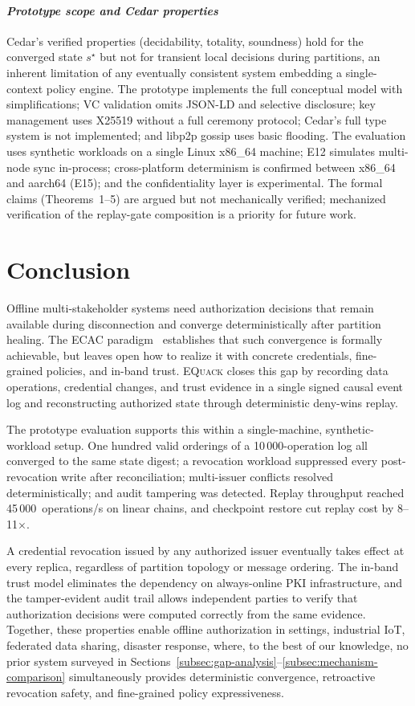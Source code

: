 \documentclass[10pt,journal,compsoc]{IEEEtran}
\newcommand{\equack}{\textsc{EQuack}}
\begin{document}
\paragraph*{\textit{Prototype scope and Cedar properties}}
Cedar's verified properties (decidability, totality, soundness) hold for the converged state $s^\star$ but not for transient local decisions during partitions, an inherent limitation of any eventually consistent system embedding a single-context policy engine. The prototype implements the full conceptual model with simplifications; VC validation omits JSON-LD and selective disclosure; key management uses X25519 without a full ceremony protocol; Cedar's full type system is not implemented; and libp2p gossip uses basic flooding. The evaluation uses synthetic workloads on a single Linux x86\_64 machine; E12 simulates multi-node sync in-process; cross-platform determinism is confirmed between x86\_64 and aarch64 (E15); and the confidentiality layer is experimental. The formal claims (Theorems~1--5) are argued but not mechanically verified; mechanized verification of the replay-gate composition is a priority for future work.

\section{Conclusion}
\label{sec:conclusion}

Offline multi-stakeholder systems need authorization decisions that remain available during disconnection and converge deterministically after partition healing. The ECAC paradigm~\cite{jacob2024eventuallyac} establishes that such convergence is formally achievable, but leaves open how to realize it with concrete credentials, fine-grained policies, and in-band trust. \equack{} closes this gap by recording data operations, credential changes, and trust evidence in a single signed causal event log and reconstructing authorized state through deterministic deny-wins replay.

The prototype evaluation supports this within a single-machine, synthetic-workload setup. One hundred valid orderings of a 10\,000-operation log all converged to the same state digest; a revocation workload suppressed every post-revocation write after reconciliation; multi-issuer conflicts resolved deterministically; and audit tampering was detected. Replay throughput reached 45\,000~operations/s on linear chains, and checkpoint restore cut replay cost by 8--11$\times$.

A credential revocation issued by any authorized issuer eventually takes effect at every replica, regardless of partition topology or message ordering. The in-band trust model eliminates the dependency on always-online PKI infrastructure, and the tamper-evident audit trail allows independent parties to verify that authorization decisions were computed correctly from the same evidence. Together, these properties enable offline authorization in settings, industrial IoT, federated data sharing, disaster response, where, to the best of our knowledge, no prior system surveyed in Sections~\ref{subsec:gap-analysis}--\ref{subsec:mechanism-comparison} simultaneously provides deterministic convergence, retroactive revocation safety, and fine-grained policy expressiveness.
\end{document}
